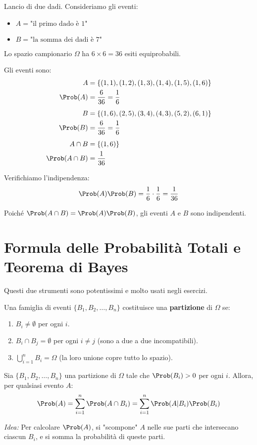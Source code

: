 \begin{example}
Lancio di due dadi. Consideriamo gli eventi:
\begin{itemize}
    \item $A = \text{"il primo dado è 1"}$
    \item $B = \text{"la somma dei dadi è 7"}$
\end{itemize}
Lo spazio campionario $\Omega$ ha $6 \times 6 = 36$ esiti equiprobabili.

Gli eventi sono:
\begin{align*}
    A &= \{(1,1), (1,2), (1,3), (1,4), (1,5), (1,6)\} \\
    \Prob(A) &= \frac{6}{36} = \frac{1}{6} \\[1ex]
    B &= \{(1,6), (2,5), (3,4), (4,3), (5,2), (6,1)\} \\
    \Prob(B) &= \frac{6}{36} = \frac{1}{6} \\[1ex]
    A \cap B &= \{(1,6)\} \\
    \Prob(A \cap B) &= \frac{1}{36}
\end{align*}

Verifichiamo l'indipendenza:
\[ \Prob(A)\Prob(B) = \frac{1}{6} \cdot \frac{1}{6} = \frac{1}{36} \]

Poiché $\Prob(A \cap B) = \Prob(A)\Prob(B)$, gli eventi $A$ e $B$ sono indipendenti.
\end{example}

\section{Formula delle Probabilità Totali e Teorema di Bayes}
Questi due strumenti sono potentissimi e molto usati negli esercizi.

\begin{definition}
Una famiglia di eventi $\{B_1, B_2, \dots, B_n\}$ costituisce una \textbf{partizione} di $\Omega$ se:
\begin{enumerate}
    \item $B_i \neq \emptyset$ per ogni $i$.
    \item $B_i \cap B_j = \emptyset$ per ogni $i \neq j$ (sono a due a due incompatibili).
    \item $\bigcup_{i=1}^n B_i = \Omega$ (la loro unione copre tutto lo spazio).
\end{enumerate}
\end{definition}

\begin{theorem}\label{theorem:formula_probabilita_totali}
Sia $\{B_1, B_2, \dots, B_n\}$ una partizione di $\Omega$ tale che $\Prob(B_i) > 0$ per ogni $i$. Allora, per qualsiasi evento $A$:
\[ \Prob(A) = \sum_{i=1}^n \Prob(A \cap B_i) = \sum_{i=1}^n \Prob(A|B_i) \Prob(B_i) \]
\end{theorem}
\textit{Idea:} Per calcolare $\Prob(A)$, si "scompone" $A$ nelle sue parti che intersecano ciascun $B_i$, e si somma la probabilità di queste parti.

